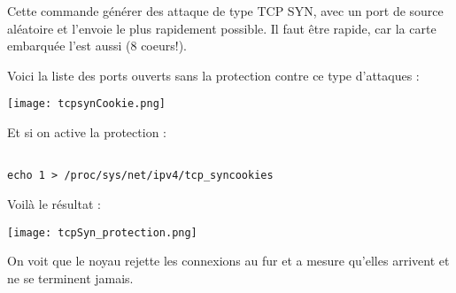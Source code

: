 Cette commande générer des attaque de type TCP SYN, avec un port de source aléatoire et l'envoie le plus rapidement possible. Il faut être rapide, car la carte embarquée l'est aussi (8 coeurs!).

Voici la liste des ports ouverts sans la protection contre ce type d'attaques :
\begin{center} 
\hspace{15cm}
\texttt{[image: tcpsynCookie.png]}
\end{center}
\vspace{0.5cm}

\pagebreak
Et si on active la protection : 
\begin{lstlisting}[frame=single,style=Console]  % Start your code-block

echo 1 > /proc/sys/net/ipv4/tcp_syncookies
\end{lstlisting}

Voilà le résultat :
\begin{center} 
\hspace{15cm}
\texttt{[image: tcpSyn\_protection.png]}
\end{center}
\vspace{0.5cm}

On voit que le noyau rejette les connexions au fur et a mesure qu'elles arrivent et ne se terminent jamais.


